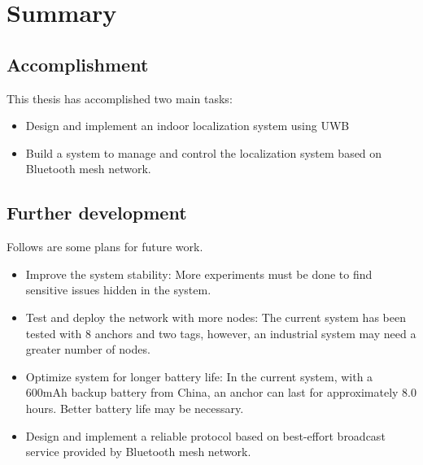 \documentclass[\main/main.tex]{subfiles}
\begin{document}
\graphicspath{{img/}{summary/img/}}

\chapter{Summary}

\section{Accomplishment}
This thesis has accomplished two main tasks:
\begin{itemize}
    \item Design and implement an indoor localization system using UWB
    \item Build a system to manage and control the localization system based on Bluetooth mesh network.
\end{itemize}

\section{Further development}
Follows are some plans for future work.
\begin{itemize}
    \item Improve the system stability: More experiments must be done to find sensitive issues hidden in the system.
    \item Test and deploy the network with more nodes: The current system has been tested with 8 anchors and two tags, however, an industrial system may need a greater number of nodes.
    \item Optimize system for longer battery life: In the current system, with a 600mAh backup battery from China, an anchor can last for approximately 8.0 hours. Better battery life may be necessary.
    \item Design and implement a reliable protocol based on best-effort broadcast service provided by Bluetooth mesh network.
\end{itemize}
\end{document}
